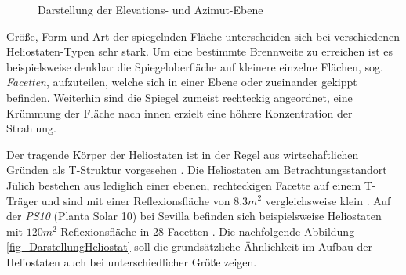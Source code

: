 \begin{figure}[h!]
    \centering
    \setlength{\fboxsep}{1pt}
    \setlength{\fboxrule}{1pt}
\caption[Darstellung der Elevations- und Azimut-Ebene]{Darstellung der Elevations- und Azimut-Ebene \cite[S.6]{DissZanger}}
    \label{fig_FreiheitsgradeHeliostat}
\end{figure}

Größe, Form und Art der spiegelnden Fläche unterscheiden sich bei verschiedenen Heliostaten-Typen sehr stark.
Um eine bestimmte Brennweite zu erreichen ist es beispielsweise denkbar die Spiegeloberfläche auf kleinere einzelne Flächen, sog. \textit{Facetten}, aufzuteilen, welche sich in einer Ebene oder zueinander gekippt befinden.
Weiterhin sind die Spiegel zumeist rechteckig angeordnet, eine Krümmung der Fläche nach innen erzielt eine höhere Konzentration der Strahlung. \cite[S.5]{DissZanger}

Der tragende Körper der Heliostaten ist in der Regel aus wirtschaftlichen Gründen als T-Struktur vorgesehen \cite[S.97]{ScottAJones}.
Die Heliostaten am Betrachtungsstandort Jülich bestehen aus lediglich einer ebenen, rechteckigen Facette auf einem T-Träger und sind mit einer Reflexionsfläche von $8.3m^2$ vergleichsweise klein \cite[S.4]{DissGall}\cite[S.13]{DissBelhomme}.
Auf der \textit{PS10} (Planta Solar 10) bei Sevilla befinden sich beispielsweise Heliostaten mit $120m^2$ Reflexionsfläche in 28 Facetten \cite[S.5]{ManuelSilva}.
Die nachfolgende Abbildung \ref{fig_DarstellungHeliostat} soll die grundsätzliche Ähnlichkeit im Aufbau der Heliostaten auch bei unterschiedlicher Größe zeigen.


